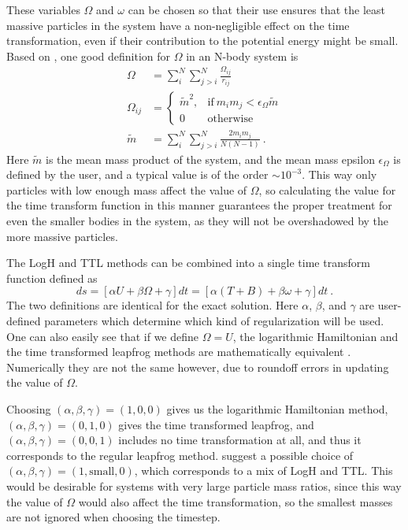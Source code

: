 \documentclass[english, oneside]{HYgradu}
\begin{document}
These variables $\Omega$ and $\omega$ can be chosen so that their use ensures that the least massive particles in the system have a non-negligible effect on the time transformation, even if their contribution to the potential energy might be small. Based on \cite{mikkola:2008b}, one good definition for $\Omega$ in an N-body system is 
\begin{equation}
\begin{aligned}
\Omega &= \sum_i^N \sum_{j>i}^N \frac{\Omega_{ij}}{r_{ij}} \\
\Omega_{ij} &=
\begin{cases}
\tilde{m}^2, &\mathrm{if} \ m_im_j < \epsilon_{\Omega} \tilde{m} \\
0  &\mathrm{otherwise}
\end{cases} \\
\tilde{m} &= \sum_i^N \sum_{j>i}^N \frac{2m_i m_j}{N(N-1)} \ .
\end{aligned}
\end{equation}
Here $\tilde{m}$ is the mean mass product of the system, and the mean mass epsilon $\epsilon_{\Omega}$ is defined by the user, and a typical value is of the order $\sim 10^{-3}$. This way only particles with low enough mass affect the value of $\Omega$, so calculating the value for the time transform function in this manner guarantees the proper treatment for even the smaller bodies in the system, as they will not be overshadowed by the more massive particles.

The LogH and TTL methods can be combined into a single time transform function defined as 
\begin{equation}
ds = [\alpha U + \beta \Omega + \gamma] dt = [\alpha (T + B) + \beta \omega + \gamma] dt \ .
\end{equation} \label{equ:regutimetransform}
The two definitions are identical for the exact solution. Here $\alpha$, $\beta$, and $\gamma$ are user-defined parameters which determine which kind of regularization will be used. One can also easily see that if we define $\Omega = U$, the logarithmic Hamiltonian and the time transformed leapfrog methods are mathematically equivalent \citep{mikkola:2008b}. Numerically they are not the same however, due to roundoff errors in updating the value of $\Omega$. 

Choosing $(\alpha, \beta, \gamma) = (1,0,0)$ gives us the logarithmic Hamiltonian method, $(\alpha, \beta, \gamma) = (0,1,0)$ gives the time transformed leapfrog, and $(\alpha, \beta, \gamma) = (0,0,1)$ includes no time transformation at all, and thus it corresponds to the regular leapfrog method. \cite{mikkola:2006} suggest a possible choice of $(\alpha, \beta, \gamma) = (1,\mathrm{small},0)$, which corresponds to a mix of LogH and TTL. This would be desirable for systems with very large particle mass ratios, since this way the value of $\Omega$ would also affect the time transformation, so the smallest masses are not ignored when choosing the timestep. 
\end{document}
